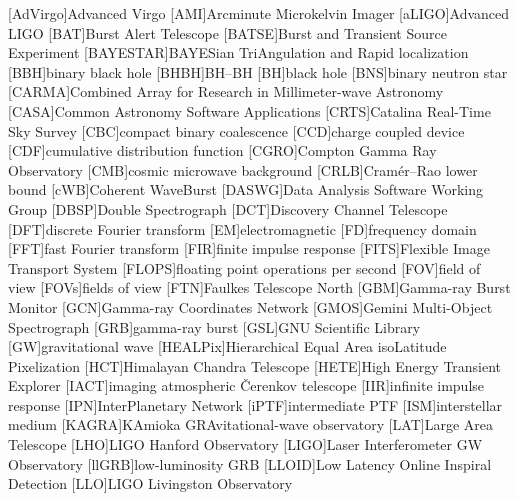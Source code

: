 \begin{acronym}
[AdVirgo]{Advanced Virgo}
[AMI]{Arcminute Microkelvin Imager}
[aLIGO]{Advanced \acs{LIGO}}
[BAT]{Burst Alert Telescope}
[BATSE]{Burst and Transient Source Experiment}
[BAYESTAR]{BAYESian TriAngulation and Rapid localization}
[BBH]{binary black hole}
[BHBH]{\acl{BH}\nobreakdashes--\acl{BH}}
[BH]{black hole}
[BNS]{binary neutron star}
[CARMA]{Combined Array for Research in Millimeter\nobreakdashes-wave Astronomy}
[CASA]{Common Astronomy Software Applications}
[CRTS]{Catalina Real-Time Sky Survey}
[CBC]{compact binary coalescence}
[CCD]{charge coupled device}
[CDF]{cumulative distribution function}
[CGRO]{Compton Gamma Ray Observatory}
[CMB]{cosmic microwave background}
[CRLB]{Cram\'{e}r\nobreakdashes--Rao lower bound}
[cWB]{Coherent WaveBurst}
[DASWG]{Data Analysis Software Working Group}
[DBSP]{Double Spectrograph}
[DCT]{Discovery Channel Telescope}
[DFT]{discrete Fourier transform}
[EM]{electromagnetic}
[FD]{frequency domain}
[FFT]{fast Fourier transform}
[FIR]{finite impulse response}
[FITS]{Flexible Image Transport System}
[FLOPS]{floating point operations per second}
[FOV]{field of view}
[FOVs]{fields of view}
[FTN]{Faulkes Telescope North}
[GBM]{Gamma-ray Burst Monitor}
[GCN]{Gamma-ray Coordinates Network}
[GMOS]{Gemini Multi-Object Spectrograph}
[GRB]{gamma-ray burst}
[GSL]{GNU Scientific Library}
[GW]{gravitational wave}
[HEALPix]{Hierarchical Equal Area isoLatitude Pixelization}
[HCT]{Himalayan Chandra Telescope}
[HETE]{High Energy Transient Explorer}
[IACT]{imaging atmospheric \v{C}erenkov telescope}
[IIR]{infinite impulse response}
[IPN]{InterPlanetary Network}
[iPTF]{intermediate \acl{PTF}}
[ISM]{interstellar medium}
[KAGRA]{KAmioka GRAvitational\nobreakdashes-wave observatory}
[LAT]{Large Area Telescope}
[LHO]{\ac{LIGO} Hanford Observatory}
[LIGO]{Laser Interferometer \acs{GW} Observatory}
[llGRB]{low\nobreakdashes-luminosity \ac{GRB}}
[LLOID]{Low Latency Online Inspiral Detection}
[LLO]{\ac{LIGO} Livingston Observatory}

\end{acronym}
